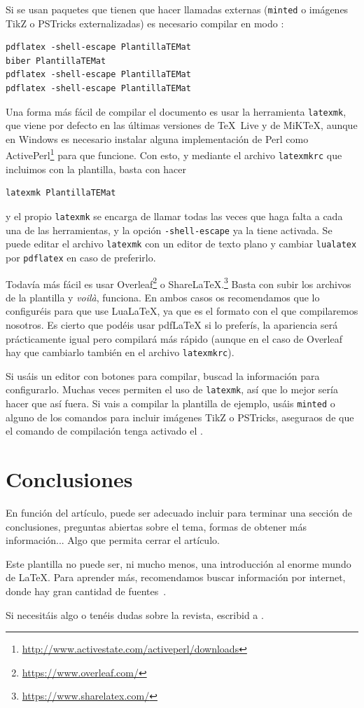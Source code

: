 \documentclass[%
extracommands,%
]{revistaanem}
\begin{document}
Si se usan paquetes que tienen que hacer llamadas externas (\verb+minted+ o imágenes TikZ o PSTricks externalizadas) es necesario compilar en modo :
\begin{verbatim}
pdflatex -shell-escape PlantillaTEMat
biber PlantillaTEMat
pdflatex -shell-escape PlantillaTEMat
pdflatex -shell-escape PlantillaTEMat
\end{verbatim}

Una forma más fácil de compilar el documento es usar la herramienta \verb+latexmk+, que viene por defecto en las últimas versiones de \TeX~Live y de MiK\TeX{}, aunque en Windows es necesario instalar alguna implementación de Perl como ActivePerl\footnote{\url{http://www.activestate.com/activeperl/downloads}} para que funcione.
Con esto, y mediante el archivo \verb+latexmkrc+ que incluimos con la plantilla, basta con hacer
\begin{verbatim}
latexmk PlantillaTEMat
\end{verbatim}
y el propio \verb+latexmk+ se encarga de llamar todas las veces que haga falta a cada una de las herramientas, y la opción \verb+-shell-escape+ ya la tiene activada.
Se puede editar el archivo \verb+latexmk+ con un editor de texto plano y cambiar \verb+lualatex+ por \verb+pdflatex+ en caso de preferirlo.

Todavía más fácil es usar Overleaf\footnote{\url{https://www.overleaf.com/}} o ShareLaTeX.\footnote{\url{https://www.sharelatex.com/}}
Basta con subir los archivos de la plantilla y \emph{voilà}, funciona.
En ambos casos os recomendamos que lo configuréis para que use LuaLaTeX, ya que es el formato con el que compilaremos nosotros.
Es cierto que podéis usar pdfLaTeX si lo preferís, la apariencia será prácticamente igual pero compilará más rápido (aunque en el caso de Overleaf hay que cambiarlo también en el archivo \verb+latexmkrc+).

Si usáis un editor con botones para compilar, buscad la información para configurarlo.
Muchas veces permiten el uso de \verb+latexmk+, así que lo mejor sería hacer que así fuera.
Si vais a compilar la plantilla de ejemplo, usáis \verb+minted+ o alguno de los comandos para incluir imágenes TikZ o PSTricks, aseguraos de que el comando de compilación tenga activado el .

\section{Conclusiones}

En función del artículo, puede ser adecuado incluir para terminar una sección de conclusiones, preguntas abiertas sobre el tema, formas de obtener más información...
Algo que permita cerrar el artículo.

Este plantilla no puede ser, ni mucho menos, una introducción al enorme mundo de \LaTeX.
Para aprender más, recomendamos buscar información por internet, donde hay gran cantidad de fuentes~\cite{wiki:latex, stackexchange, texample}.

Si necesitáis algo o tenéis dudas sobre la revista, escribid a .

\nocite{*}
\printbibliography[heading=bibintoc]
\end{document}
